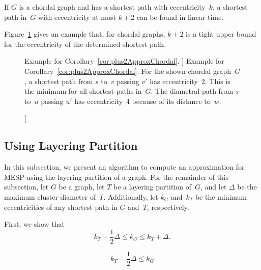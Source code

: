 \begin{corollary}
    \label{cor:plus2ApproxChordal}
If \( G \) is a chordal graph and has a shortest path with eccentricity~\( k \), a shortest path in~\( G \) with eccentricity at most \( k + 2 \) can be found in linear time.
\end{corollary}

Figure~\ref{fig:chordalEg} gives an example that, for chordal graphs, $k + 2$ is a tight upper bound for the eccentricity of the determined shortest path.

\begin{figure}
    [htb]
    \centering
    \caption
    [%
        Example for Corollary~\ref{cor:plus2ApproxChordal}.
    ]
    {
        Example for Corollary~\ref{cor:plus2ApproxChordal}.
        For the shown chordal graph~$G$, a shortest path from $s$ to~$v$ passing $v'$ has eccentricity~$2$.
        This is the minimum for all shortest paths in~$G$.
        The diametral path from $s$ to~$u$ passing $u'$ has eccentricity~$4$ because of its distance to~$w$.
    }
    \label{fig:chordalEg}
\end{figure}

\subsection{Using Layering Partition}
In this subsection, we present an algorithm to compute an approximation for MESP using the layering partition of a graph.
For the remainder of this subsection, let $G$ be a graph, let $T$ be a layering partition of~$G$, and let $\Delta$ be the maximum cluster diameter of~$T$.
Additionally, let $k_G$ and~$k_T$ be the minimum eccentricities of any shortest path in $G$ and~$T$, respectively.

First, we show that
\[
    k_T - \frac{1}{2} \Delta \leq k_G \leq k_T + \Delta.
\]

\begin{lemma}
    \label{lem:mespLayPartLowBound}
\[
    k_T - \frac{1}{2} \Delta \leq k_G
\]
\end{lemma}

